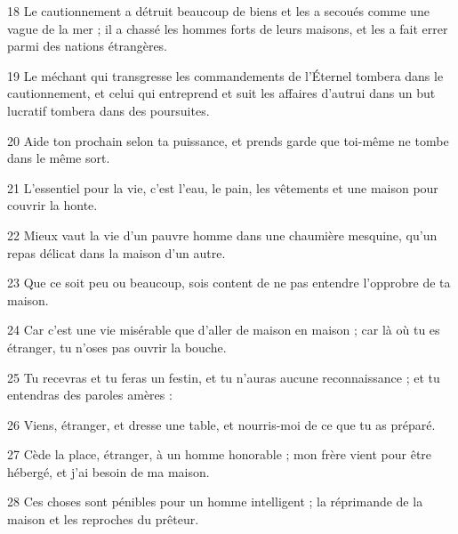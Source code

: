 \par 18 Le cautionnement a détruit beaucoup de biens et les a secoués comme une vague de la mer ; il a chassé les hommes forts de leurs maisons, et les a fait errer parmi des nations étrangères.
\par 19 Le méchant qui transgresse les commandements de l'Éternel tombera dans le cautionnement, et celui qui entreprend et suit les affaires d'autrui dans un but lucratif tombera dans des poursuites.
\par 20 Aide ton prochain selon ta puissance, et prends garde que toi-même ne tombe dans le même sort.
\par 21 L'essentiel pour la vie, c'est l'eau, le pain, les vêtements et une maison pour couvrir la honte.
\par 22 Mieux vaut la vie d'un pauvre homme dans une chaumière mesquine, qu'un repas délicat dans la maison d'un autre.
\par 23 Que ce soit peu ou beaucoup, sois content de ne pas entendre l'opprobre de ta maison.
\par 24 Car c'est une vie misérable que d'aller de maison en maison ; car là où tu es étranger, tu n'oses pas ouvrir la bouche.
\par 25 Tu recevras et tu feras un festin, et tu n'auras aucune reconnaissance ; et tu entendras des paroles amères :
\par 26 Viens, étranger, et dresse une table, et nourris-moi de ce que tu as préparé.
\par 27 Cède la place, étranger, à un homme honorable ; mon frère vient pour être hébergé, et j'ai besoin de ma maison.
\par 28 Ces choses sont pénibles pour un homme intelligent ; la réprimande de la maison et les reproches du prêteur.


